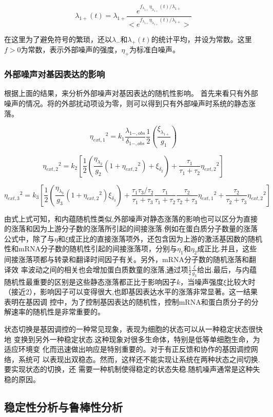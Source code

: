 \documentclass[withoutpreface,bwprint]{cumcmthesis} %
\begin{document}
$$\lambda_{1+}(t)=\lambda_{1+}\frac{e^{f_{\lambda_{1+}}\eta_{\lambda_{1+}}(t)/\lambda_{1+}}}{<e^{f_{\lambda_{1+}}\eta_{\lambda_{1+}}(t)/\lambda_{1+}}>}$$

在这里为了避免符号的繁琐，还以$\lambda_-$和$\lambda_+(t)$的统计平均，并设为常数。这里$f>0$为常数，表示外部噪声的强度，$\eta_+$为标准白噪声。
\subsubsection{外部噪声对基因表达的影响}
根据上面的结果，来分析外部噪声对基因表达的随机性影响。
首先来看只有外部噪声的情况。将的外部扰动项设为零，则可以得到只有外部噪声时系统的静态涨落。

$${\eta_{ext,1}}^2 = k_1 \frac{\lambda_{1-,obs}}{\delta_{1-,obs}}\frac{1}{2}(\frac{\xi_{\lambda_{1+}}}{g_1})$$

$${\eta_{ext,2}}^2 = k_2[\frac{1}{2}(\frac{\eta_{\lambda_2}}{g_2}(1+{\eta_{ext,2}}^2)+\xi_{\delta_2})+\frac{\tau_1}{\tau_1+\tau_2}{\eta_{ext,2}}^2]$$

$${\eta_{ext,3}}^2 = k_3[\frac{1}{2}(\frac{\eta_{\lambda_3}}{g_3}(1+{\eta_{ext,2}}^2)\xi_{\delta_3})+\frac{\tau_1\tau_3/\tau_2}{\tau_1+\tau_3}\frac{\tau_1}{\tau_1+\tau_2}\frac{\tau_2}{\tau_2+\tau_3}{\eta_{ext,1}}^2+\frac{\tau_2}{\tau_2+\tau_3}{\eta_{ext,2}}^2]$$

由式上式可知，和内蕴随机性类似,外部噪声对静态涨落的影响也可以区分为直接的涨落和因为上游分子数的涨落所引起的间接涨落.例如在蛋白质分子数量的涨落公式中，除了与$\eta$和$\xi$成正比的直接涨落项外，还包含因为上游的激活基因数的随机性和mRNA分子数的随机性引起的间接涨落项，分别与$\eta_1$和$\eta_2$成正比.并且，这些间接涨落项都与转录和翻译时间因子有关。另外，mRNA分子数的随机涨落和翻译效 率波动之间的相关也会增加蛋白质数童的涨落,通过项$\frac{1}{2} \frac{\xi}{g_3}$给出.最后，与内蕴随机性最重要的区别是这些静态涨落都正比于影响因子$k$，当噪声强度$\xi$比较大时（接近2），影响因子可以变得很大,也即基因表达水平的涨落非常显著。这一结果表明在基因调 控中，为了控制基因表达的随机性，控制mRNA和蛋白质分子的分解速率的随机性是非常重要的。

状态切换是基因调控的一种常见现象，表现为细胞的状态可以从一种稳定状态很快地 变换到另外一种稳定状态.这种现象对很多生命体，特别是低等单细胞生命，为适应环境变 化而迅速做出响应是特别重要的。对于有正反馈和协作的基因调控网络，系统可 以表现出双稳态。然而，这样还不能实现让系统在两种状态之间切换.要实现状态的切换，还 需要一种机制使得稳定的状态失稳.随机噪声通常是这种失稳的原因。

\subsection{稳定性分析与鲁棒性分析}
\end{document}
